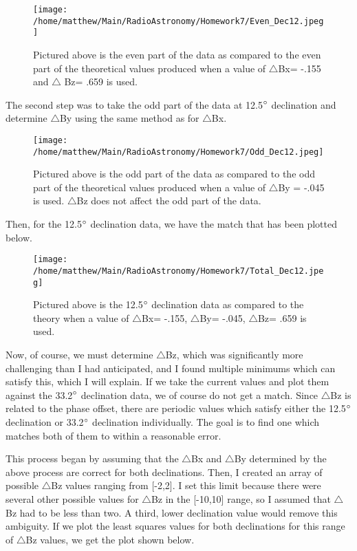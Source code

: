 \documentclass{article}
\begin{document}
\begin{figure}[H]
\centering
\texttt{[image: /home/matthew/Main/RadioAstronomy/Homework7/Even\_Dec12.jpeg]}
\caption{Pictured above is the even part of the data as compared to the even part of the theoretical values produced when a value of $\triangle$Bx= -.155 and $\triangle$ Bz= .659 is used.}
\end{figure}

The second step was to take the odd part of the data at 12.5$\degree$ declination and determine $\triangle$By using the same method as for $\triangle$Bx.

\begin{figure}[H]
\centering
\texttt{[image: /home/matthew/Main/RadioAstronomy/Homework7/Odd\_Dec12.jpeg]}
\caption{Pictured above is the odd part of the data as compared to the odd part of the theoretical values produced when a value of $\triangle$By = -.045 is used. $\triangle$Bz does not affect the odd part of the data.}
\end{figure}

Then, for the 12.5$\degree$ declination data, we have the match that has been plotted below.  

\begin{figure}[H]
\centering
\texttt{[image: /home/matthew/Main/RadioAstronomy/Homework7/Total\_Dec12.jpeg]}
\caption{Pictured above is the 12.5$\degree$ declination data as compared to the theory when a value of $\triangle$Bx= -.155, $\triangle$By= -.045, $\triangle$Bz= .659 is used.}
\end{figure}

Now, of course, we must determine $\triangle$Bz, which was significantly more challenging than I had anticipated, and I found multiple minimums which can satisfy this, which I will explain.  If we take the current values and plot them against the 33.2$\degree$ declination data, we of course do not get a match.  Since $\triangle$Bz is related to the phase offset, there are periodic values which satisfy either the 12.5$\degree$ declination or 33.2$\degree$ declination individually.  The goal is to find one which matches both of them to within a reasonable error.

This process began by assuming that the $\triangle$Bx and $\triangle$By determined by the above process are correct for both declinations.  Then, I created an array of possible $\triangle$Bz values ranging from [-2,2].  I set this limit because there were several other possible values for $\triangle$Bz in the [-10,10] range, so I assumed that $\triangle$Bz had to be less than two.  A third, lower declination value would remove this ambiguity.  
If we plot the least squares values for both declinations for this range of $\triangle$Bz values, we get the plot shown below.
\end{document}
